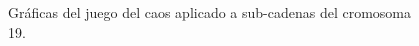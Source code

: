\documentclass[letterpaper,12pt,oneside]{book}
\begin{document}
\begin{figure}[h!]
\centering
\begin{minipage}{0.3\linewidth}
\centering
{}
\end{minipage}%
\begin{minipage}{0.3\linewidth}
\centering
{}
\end{minipage}

\caption{Gráficas del juego del caos aplicado a sub-cadenas del cromosoma 19. }
\label{fig:CG_chr19}
\end{figure}
\end{document}
